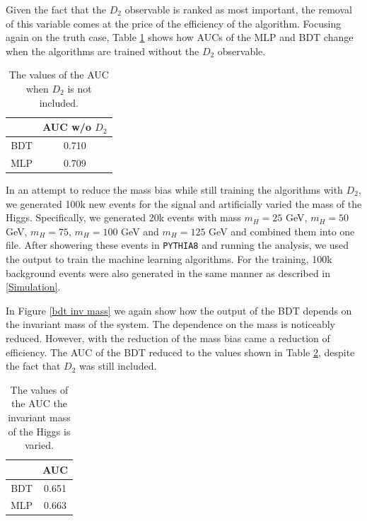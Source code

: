 \documentclass[10pt,a4paper]{book}
\def\code#1{\texttt{#1}}
\begin{document}
Given the fact that the $D_2$ observable is ranked as most important, the removal of this variable comes at the price of the efficiency of the algorithm. Focusing again on the truth case, Table \ref{AUC table} shows how AUCs of the MLP and BDT change when the algorithms are trained without the $D_2$ observable.

\begin{table}[h!]
\centering
\begin{tabular}{|c|c|}
\hline 
\* & AUC w/o $D_2$ \\ 
\hline 
BDT &  0.710\\ 
\hline 
MLP &  0.709\\ 
\hline 
\end{tabular}
\caption{The values of the AUC when $D_2$ is not included.}
\label{AUC table}
\end{table}

In an attempt to reduce the mass bias while still training the algorithms with $D_2$, we generated 100k new events for the signal and artificially varied the mass of the Higgs. Specifically, we generated 20k events with mass $m_H = 25$ GeV, $m_H = 50$ GeV, $m_H = 75$, $m_H = 100$ GeV and $m_H = 125$ GeV and combined them into one file. After showering these events in \code{PYTHIA8} and running the analysis, we used the output to train the machine learning algorithms. For the training, 100k background events were also generated in the same manner as described in \ref{Simulation}.

In Figure \ref{bdt inv mass} we again show how the output of the BDT depends on the invariant mass of the system. The dependence on the mass is noticeably reduced. However, with the reduction of the mass bias came a reduction of efficiency. The AUC of the BDT reduced to the values shown in Table \ref{AUC table mass bias}, despite the fact that $D_2$ was still included.

\begin{table}[h!]
\centering
\begin{tabular}{|c|c|}
\hline 
\* & AUC \\ 
\hline 
BDT & 0.651 \\ 
\hline 
MLP &  0.663\\ 
\hline 
\end{tabular}
\caption{The values of the AUC the invariant mass of the Higgs is varied.}
\label{AUC table mass bias}
\end{table}
\end{document}
